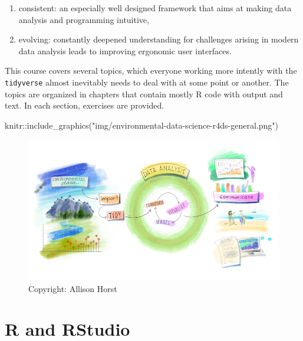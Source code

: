\documentclass[]{book}
\newenvironment{Shaded}{}{}
\newcommand{\KeywordTok}[1]{\textcolor[rgb]{0.00,0.00,1.00}{#1}}
\newcommand{\NormalTok}[1]{#1}
\newcommand{\OperatorTok}[1]{#1}
\newcommand{\StringTok}[1]{\textcolor[rgb]{0.00,0.50,0.50}{#1}}
\providecommand{\tightlist}{%
  \setlength{\itemsep}{0pt}\setlength{\parskip}{0pt}}
\begin{document}
\begin{enumerate}
\def\labelenumi{\arabic{enumi}.}
\tightlist
\item
  consistent: an especially well designed framework that aims at making data analysis and programming intuitive,
\item
  evolving: constantly deepened understanding for challenges arising in modern data analysis leads to improving ergonomic user interfaces.
\end{enumerate}

This course covers several topics, which everyone working more intently with the \texttt{tidyverse} almost inevitably needs to deal with at some point or another.
The topics are organized in chapters that contain mostly R code with output and text.
In each section, exercises are provided.

\begin{Shaded}
\begin{Highlighting}[]
\NormalTok{knitr}\OperatorTok{::}\KeywordTok{include_graphics}\NormalTok{(}\StringTok{"img/environmental-data-science-r4ds-general.png"}\NormalTok{)}
\end{Highlighting}
\end{Shaded}

\begin{figure}

\hfill{}\includegraphics[width=11.11in]{img/environmental-data-science-r4ds-general} 

\caption{Copyright: Allison Horst}\label{fig:r4ds}
\end{figure}

\hypertarget{r-and-rstudio}{%
\chapter{R and RStudio}\label{r-and-rstudio}}
\end{document}
